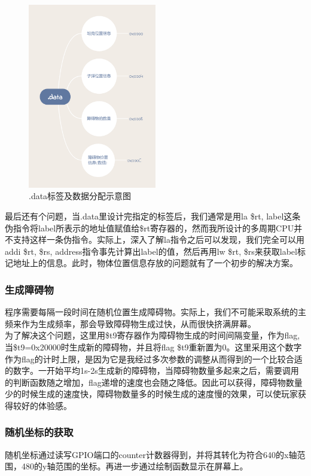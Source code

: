 \begin{figure}[H]
  \centering
  \includegraphics[width=0.5\textwidth]{img/data.png}
  \caption{.data标签及数据分配示意图
  }\label{fig:data}
\end{figure}

最后还有个问题，当.data里设计完指定的标签后，我们通常是用la \$rt, label这条伪指令将label所表示的地址值赋值给\$rt寄存器的，然而我所设计的多周期CPU并不支持这样一条伪指令。实际上，深入了解la指令之后可以发现，我们完全可以用addi \$rt, \$rs, address指令事先计算出label的值，然后再用lw \$rt, \$rs来获取label标记地址上的信息。此时，物体位置信息存放的问题就有了一个初步的解决方案。\\

\subsubsection{生成障碍物}
程序需要每隔一段时间在随机位置生成障碍物。实际上，我们不可能采取系统的主频来作为生成频率，那会导致障碍物生成过快，从而很快挤满屏幕。\\

为了解决这个问题，这里用\$t9寄存器作为障碍物生成的时间间隔变量，作为flag, 当\$t9=0x20000时生成新的障碍物，并且将flag \$t9重新置为0。这里采用这个数字作为flag的计时上限，是因为它是我经过多次参数的调整从而得到的一个比较合适的数字。一开始平均1s-2s生成新的障碍物，当障碍物数量多起来之后，需要调用的判断函数随之增加，flag递增的速度也会随之降低。因此可以获得，障碍物数量少的时候生成的速度快，障碍物数量多的时候生成的速度慢的效果，可以使玩家获得较好的体验感。

\subsubsection{随机坐标的获取}
随机坐标通过读写GPIO端口的counter计数器得到，并将其转化为符合640的x轴范围，480的y轴范围的坐标。再进一步通过绘制函数显示在屏幕上。

